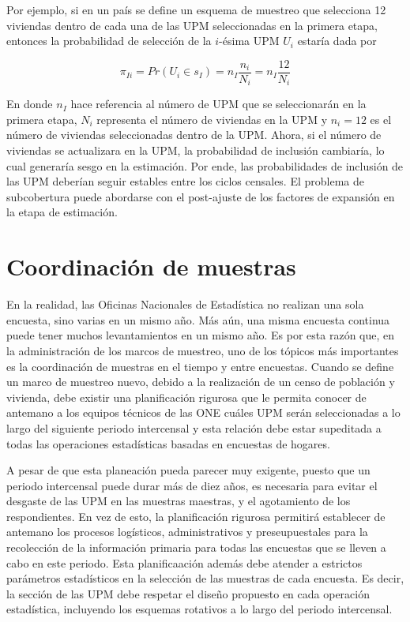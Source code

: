 \documentclass[
  12pt,
]{book}
\begin{document}
Por ejemplo, si en un país se define un esquema de muestreo que selecciona 12 viviendas dentro de cada una de las UPM seleccionadas en la primera etapa, entonces la probabilidad de selección de la \(i\)-ésima UPM \(U_i\) estaría dada por

\[
\pi_{Ii}=Pr(U_i \in s_I)=n_I\frac{n_i}{N_i}=n_I\frac{12}{N_i}
\]

En donde \(n_I\) hace referencia al número de UPM que se seleccionarán en la primera etapa, \(N_i\) representa el número de viviendas en la UPM y \(n_i=12\) es el número de viviendas seleccionadas dentro de la UPM. Ahora, si el número de viviendas se actualizara en la UPM, la probabilidad de inclusión cambiaría, lo cual generaría sesgo en la estimación. Por ende, las probabilidades de inclusión de las UPM deberían seguir estables entre los ciclos censales. El problema de subcobertura puede abordarse con el post-ajuste de los factores de expansión en la etapa de estimación.

\hypertarget{coordinaciuxf3n-de-muestras}{%
\section{Coordinación de muestras}\label{coordinaciuxf3n-de-muestras}}

En la realidad, las Oficinas Nacionales de Estadística no realizan una sola encuesta, sino varias en un mismo año. Más aún, una misma encuesta continua puede tener muchos levantamientos en un mismo año. Es por esta razón que, en la administración de los marcos de muestreo, uno de los tópicos más importantes es la coordinación de muestras en el tiempo y entre encuestas. Cuando se define un marco de muestreo nuevo, debido a la realización de un censo de población y vivienda, debe existir una planificación rigurosa que le permita conocer de antemano a los equipos técnicos de las ONE cuáles UPM serán seleccionadas a lo largo del siguiente periodo intercensal y esta relación debe estar supeditada a todas las operaciones estadísticas basadas en encuestas de hogares.

A pesar de que esta planeación pueda parecer muy exigente, puesto que un periodo intercensal puede durar más de diez años, es necesaria para evitar el desgaste de las UPM en las muestras maestras, y el agotamiento de los respondientes. En vez de esto, la planificación rigurosa permitirá establecer de antemano los procesos logísticos, administrativos y preseupuestales para la recolección de la información primaria para todas las encuestas que se lleven a cabo en este periodo. Esta planificaación además debe atender a estrictos parámetros estadísticos en la selección de las muestras de cada encuesta. Es decir, la sección de las UPM debe respetar el diseño propuesto en cada operación estadística, incluyendo los esquemas rotativos a lo largo del periodo intercensal.
\end{document}
